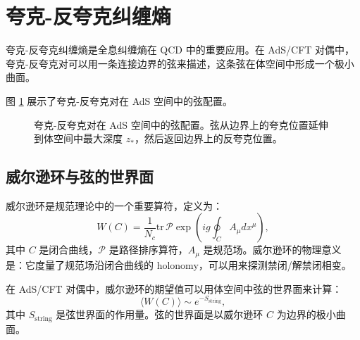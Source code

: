 \section{夸克-反夸克纠缠熵}

夸克-反夸克纠缠熵是全息纠缠熵在 QCD 中的重要应用。在 AdS/CFT 对偶中，夸克-反夸克对可以用一条连接边界的弦来描述，这条弦在体空间中形成一个极小曲面。

图 \ref{fig:qq_string} 展示了夸克-反夸克对在 AdS 空间中的弦配置。

\begin{figure}[htbp]
\centering
{}
\caption{夸克-反夸克对在 AdS 空间中的弦配置。弦从边界上的夸克位置延伸到体空间中最大深度 $z_*$，然后返回边界上的反夸克位置。}
\label{fig:qq_string}
\end{figure}

\subsection{威尔逊环与弦的世界面}

\begin{definition}[威尔逊环]
威尔逊环是规范理论中的一个重要算符，定义为：
\begin{equation}
    W(C) = \frac{1}{N_c} \text{tr} \, \mathcal{P} \exp\left(ig \oint_C A_\mu dx^\mu\right),
\end{equation}
其中 $C$ 是闭合曲线，$\mathcal{P}$ 是路径排序算符，$A_\mu$ 是规范场。威尔逊环的物理意义是：它度量了规范场沿闭合曲线的 holonomy，可以用来探测禁闭/解禁闭相变。
\end{definition}

在 AdS/CFT 对偶中，威尔逊环的期望值可以用体空间中弦的世界面来计算：
\begin{equation}
    \langle W(C) \rangle \sim e^{-S_{\text{string}}},
\end{equation}
其中 $S_{\text{string}}$ 是弦世界面的作用量。弦的世界面是以威尔逊环 $C$ 为边界的极小曲面。

